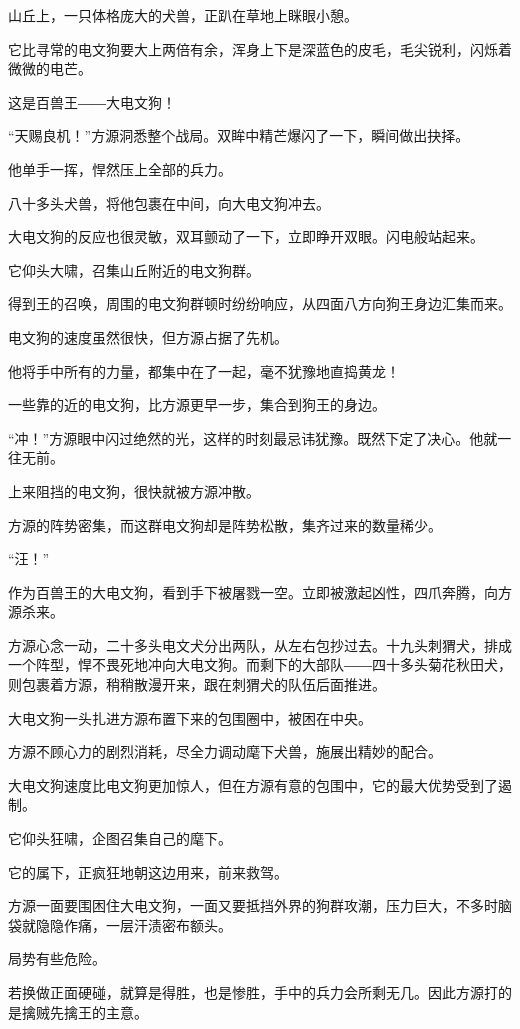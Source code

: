 \begin{this_body}
山丘上，一只体格庞大的犬兽，正趴在草地上眯眼小憩。

它比寻常的电文狗要大上两倍有余，浑身上下是深蓝色的皮毛，毛尖锐利，闪烁着微微的电芒。

这是百兽王――大电文狗！

“天赐良机！”方源洞悉整个战局。双眸中精芒爆闪了一下，瞬间做出抉择。

他单手一挥，悍然压上全部的兵力。

八十多头犬兽，将他包裹在中间，向大电文狗冲去。

大电文狗的反应也很灵敏，双耳颤动了一下，立即睁开双眼。闪电般站起来。

它仰头大啸，召集山丘附近的电文狗群。

得到王的召唤，周围的电文狗群顿时纷纷响应，从四面八方向狗王身边汇集而来。

电文狗的速度虽然很快，但方源占据了先机。

他将手中所有的力量，都集中在了一起，毫不犹豫地直捣黄龙！

一些靠的近的电文狗，比方源更早一步，集合到狗王的身边。

“冲！”方源眼中闪过绝然的光，这样的时刻最忌讳犹豫。既然下定了决心。他就一往无前。

上来阻挡的电文狗，很快就被方源冲散。

方源的阵势密集，而这群电文狗却是阵势松散，集齐过来的数量稀少。

“汪！”

作为百兽王的大电文狗，看到手下被屠戮一空。立即被激起凶性，四爪奔腾，向方源杀来。

方源心念一动，二十多头电文犬分出两队，从左右包抄过去。十九头刺猬犬，排成一个阵型，悍不畏死地冲向大电文狗。而剩下的大部队――四十多头菊花秋田犬，则包裹着方源，稍稍散漫开来，跟在刺猬犬的队伍后面推进。

大电文狗一头扎进方源布置下来的包围圈中，被困在中央。

方源不顾心力的剧烈消耗，尽全力调动麾下犬兽，施展出精妙的配合。

大电文狗速度比电文狗更加惊人，但在方源有意的包围中，它的最大优势受到了遏制。

它仰头狂啸，企图召集自己的麾下。

它的属下，正疯狂地朝这边用来，前来救驾。

方源一面要围困住大电文狗，一面又要抵挡外界的狗群攻潮，压力巨大，不多时脑袋就隐隐作痛，一层汗渍密布额头。

局势有些危险。

若换做正面硬碰，就算是得胜，也是惨胜，手中的兵力会所剩无几。因此方源打的是擒贼先擒王的主意。


\end{this_body}
